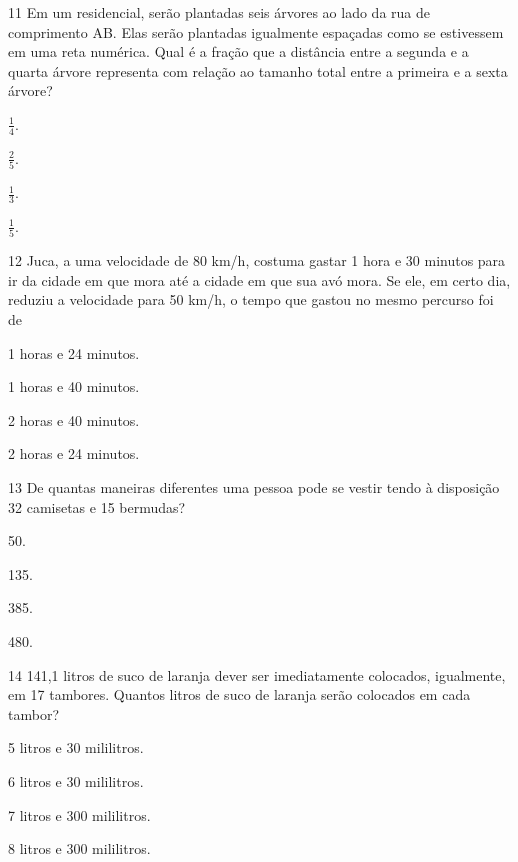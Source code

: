 \num{11} Em um residencial, serão plantadas seis árvores ao lado da rua de comprimento AB. Elas
serão plantadas igualmente espaçadas como se estivessem em uma reta numérica.
Qual é a fração que a distância entre a segunda e a quarta árvore
representa com relação ao tamanho total entre a primeira e a sexta árvore?

\begin{escolha}
\item
  $\frac{1}{4}$.
\item
  $\frac{2}{5}$.
\item
  $\frac{1}{3}$.
\item
  $\frac{1}{5}$.
\end{escolha}


\num{12} Juca, a uma velocidade de 80 km/h, costuma gastar 1 hora e 30 minutos
para ir da cidade em que mora até a cidade em que sua avó mora. Se ele,
em certo dia, reduziu a velocidade para 50 km/h, o tempo que gastou no mesmo percurso foi de

\begin{escolha}
\item
  1 horas e 24 minutos.
\item
  1 horas e 40 minutos.
\item
  2 horas e 40 minutos.
\item
  2 horas e 24 minutos.
\end{escolha}


\num{13} De quantas maneiras diferentes uma pessoa pode se vestir tendo à
disposição 32 camisetas e 15 bermudas?

\begin{multicols}{2}
\begin{escolha}
\item
  50.
\item
  135.
\item
  385.
\item
  480.
\end{escolha}
\end{multicols}

\num{14} 141,1 litros de suco de laranja dever ser imediatamente colocados,
igualmente, em 17 tambores. Quantos litros de suco de laranja serão
colocados em cada tambor?

\begin{escolha}
\item
  5 litros e 30 mililitros.
\item
  6 litros e 30 mililitros.
\item
  7 litros e 300 mililitros.
\item
  8 litros e 300 mililitros.
\end{escolha}

